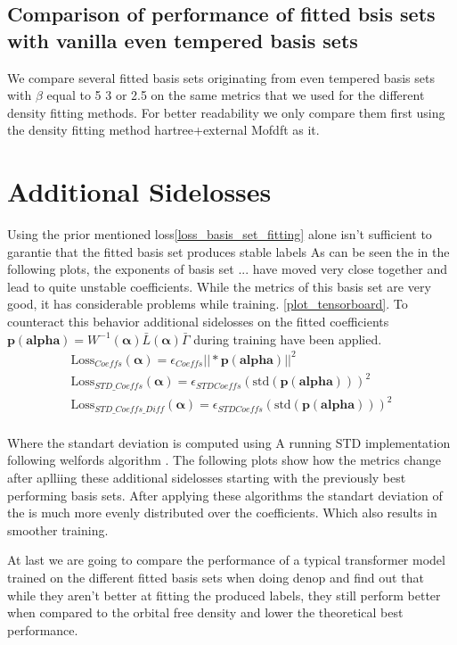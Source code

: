  \subsection{Comparison of performance of fitted bsis sets with vanilla even tempered basis sets}
 We compare several fitted basis sets originating from even tempered basis sets with $\beta$ equal to 5 3 or 2.5 on the same metrics that we used for the different density fitting methods. For better readability we only compare them first using the density fitting method hartree+external Mofdft as it.
 \section{Additional Sidelosses}
 Using the prior mentioned loss\ref{loss_basis_set_fitting} alone isn't sufficient to garantie that the fitted basis set produces stable labels As can be seen the in the following plots, the exponents of basis set ... have moved very close together and lead to quite unstable coefficients. While the metrics of this basis set are very good, it has considerable problems while training. \ref{plot_tensorboard}.
 To counteract this behavior additional sidelosses on the fitted coefficients $\mathbf{p}(\mathbf{alpha}) = W^{-1}(\mathbf{\alpha}) \bar L(\mathbf{\alpha}) \bar \Gamma$ during training have been applied. 
 \begin{align}
    \text{Loss}_{Coeffs}(\mathbf{\alpha}) = \epsilon_{Coeffs}||*\mathbf{p}(\mathbf{alpha})||^2\\
    \text{Loss}_{STD\_Coeffs}(\mathbf{\alpha}) = \epsilon_{STDCoeffs}\left(\text{std}(\mathbf{p}(\mathbf{alpha}))\right)^2\\
    \text{Loss}_{STD\_Coeffs\_Diff}(\mathbf{\alpha}) = \epsilon_{STDCoeffs}\left(\text{std}(\mathbf{p}(\mathbf{alpha}))\right)^2\\
 \end{align}

 Where the standart deviation is computed using A running STD implementation following welfords algorithm \cite{Welford}. 
 The following plots show how the metrics change after aplliing these additional sidelosses starting with the previously best performing basis sets.
 After applying these algorithms the standart deviation of the is much more evenly distributed over the coefficients. 
 Which also results in smoother training.

 At last we are going to compare the performance of a typical transformer model trained on the different fitted basis sets when doing denop and find out that while they aren't better at fitting the produced labels, they still perform better when compared to the orbital free density and lower the theoretical best performance.
 







